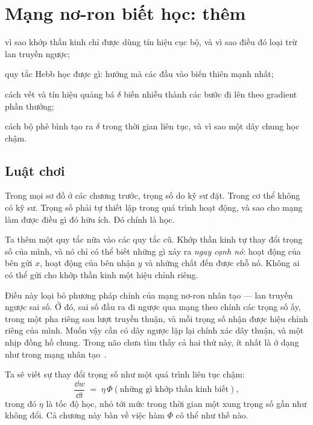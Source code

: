 \chapter{Mạng nơ-ron biết học: thêm }
\label{sec:dofa}
\begin{chaptergoals}
\item vì sao khớp thần kinh chỉ được dùng tín hiệu cục bộ, và vì sao điều đó loại trừ lan truyền ngược;
\item quy tắc Hebb học được gì: hướng mà các đầu vào biến thiên mạnh nhất;
\item cách vết và tín hiệu quảng bá $\delta$ biến nhiễu thành các bước đi lên theo gradient phần thưởng;
\item cách bộ phê bình tạo ra $\delta$ trong thời gian liên tục, và vì sao một dây chung học chậm.
\end{chaptergoals}

\section{Luật chơi}

Trong mọi sơ đồ ở các chương trước, trọng số do kỹ sư đặt. Trong cơ thể không có kỹ sư. Trọng số phải tự thiết lập trong quá trình hoạt động, và sao cho mạng làm được điều gì đó hữu ích. Đó chính là học.

Ta thêm một quy tắc nữa vào các quy tắc cũ. Khớp thần kinh tự thay đổi trọng số của mình, và nó chỉ có thể biết những gì xảy ra \emph{ngay cạnh nó}: hoạt động của bên gửi $x$, hoạt động của bên nhận $y$ và những chất đến được chỗ nó. Không ai có thể gửi cho khớp thần kinh một hiệu chỉnh riêng.

Điều này loại bỏ phương pháp chính của mạng nơ-ron nhân tạo --- lan truyền ngược sai số. Ở đó, sai số đầu ra đi ngược qua mạng theo chính các trọng số ấy, trong một pha riêng sau lượt truyền thuận, và mỗi trọng số nhận được hiệu chỉnh riêng của mình. Muốn vậy cần có dây ngược lặp lại chính xác dây thuận, và một nhịp đồng hồ chung. Trong não chưa tìm thấy cả hai thứ này, ít nhất là ở dạng như trong mạng nhân tạo~\cite{Lillicrap2020,WhittingtonBogacz2019}.

Ta sẽ viết sự thay đổi trọng số như một quá trình liên tục chậm:
\begin{equation}
\frac{\dd w}{\dd t} \;=\; \eta\,\Phi(\text{những gì khớp thần kinh biết}),
\label{eq:plasticity}
\end{equation}
trong đó $\eta$ là tốc độ học, nhỏ tới mức trong thời gian một xung trọng số gần như không đổi. Cả chương này bàn về việc hàm $\Phi$ có thể như thế nào.

